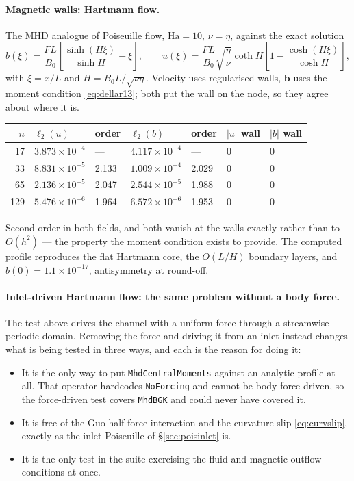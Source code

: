 \documentclass[11pt,a4paper]{article}
\newcommand{\code}[1]{\texttt{\small #1}}
\newcommand{\bb}{\bm{b}}
\newcommand{\e}[1]{\times 10^{#1}}
\begin{document}
\paragraph{Magnetic walls: Hartmann flow.} The MHD analogue of Poiseuille flow,
$\mathrm{Ha}=10$, $\nu=\eta$, against the exact solution~\cite{dellar2013bc}
\begin{equation}
  b(\xi) = \frac{FL}{B_0}\left[\frac{\sinh(H\xi)}{\sinh H}-\xi\right],
  \qquad
  u(\xi) = \frac{FL}{B_0}\sqrt{\frac{\eta}{\nu}}\coth H
           \left[1-\frac{\cosh(H\xi)}{\cosh H}\right],
  \label{eq:hartmann}
\end{equation}
with $\xi=x/L$ and $H=B_0L/\sqrt{\nu\eta}$. Velocity uses regularised walls,
$\bb$ uses the moment condition \eqref{eq:dellar13}; both put the wall on the
node, so they agree about where it is.
\begin{center}\small
\begin{tabular}{rllllll}
\toprule
$n$ & $\ell_2(u)$ & order & $\ell_2(b)$ & order & $|u|$ wall & $|b|$ wall \\
\midrule
17  & $3.873\e{-4}$ & ---   & $4.117\e{-4}$ & ---   & $0$ & $0$ \\
33  & $8.831\e{-5}$ & 2.133 & $1.009\e{-4}$ & 2.029 & $0$ & $0$ \\
65  & $2.136\e{-5}$ & 2.047 & $2.544\e{-5}$ & 1.988 & $0$ & $0$ \\
129 & $5.476\e{-6}$ & 1.964 & $6.572\e{-6}$ & 1.953 & $0$ & $0$ \\
\bottomrule
\end{tabular}
\end{center}
\noindent Second order in both fields, and both vanish at the walls exactly
rather than to $O(h^2)$ --- the property the moment condition exists to provide.
The computed profile reproduces the flat Hartmann core, the $O(L/H)$ boundary
layers, and $b(0)=1.1\e{-17}$, antisymmetry at round-off.

\paragraph{Inlet-driven Hartmann flow: the same problem without a body force.}
\label{sec:hartmanninlet}
The test above drives the channel with a uniform force through a
streamwise-periodic domain. Removing the force and driving it from an inlet
instead changes what is being tested in three ways, and each is the reason for
doing it:
\begin{itemize}[leftmargin=1.4em,itemsep=2pt]
\item It is the only way to put \code{MhdCentralMoments} against an analytic
      profile at all. That operator hardcodes \code{NoForcing} and cannot be
      body-force driven, so the force-driven test covers \code{MhdBGK} and could
      never have covered it.
\item It is free of the Guo half-force interaction and the curvature slip
      \eqref{eq:curvslip}, exactly as the inlet Poiseuille of
      \S\ref{sec:poisinlet} is.
\item It is the only test in the suite exercising the fluid and magnetic outflow
      conditions at once.
\end{itemize}
\end{document}
